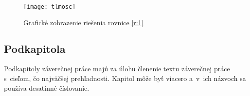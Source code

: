 \begin{figure}[ht!]
\centering
\texttt{[image: tlmosc]}
\caption{Grafické zobrazenie riešenia rovnice \ref{r:1}}\label{o:2}
\end{figure}



\subsection{Podkapitola}
Podkapitoly záverečnej práce majú za úlohu členenie textu záverečnej
práce s~cieľom, čo najväčšej prehľadnosti. Kapitol môže byť viacero
a~v~ich názvoch sa používa desatinné číslovanie.